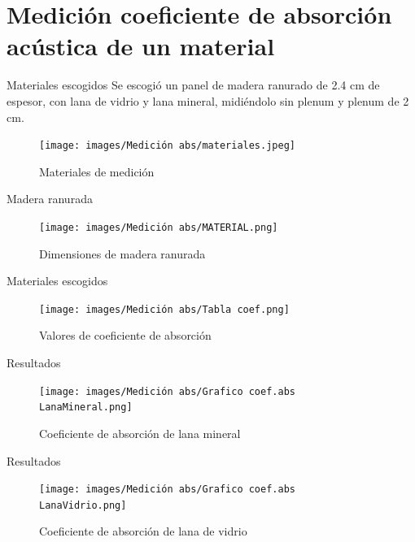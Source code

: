 \documentclass{sintefbeamer}
\begin{document}
\section{Medición coeficiente de absorción acústica de un material}
\begin{frame}{Materiales escogidos}
    Se escogió un panel de madera ranurado de 2.4 cm de espesor, con lana de vidrio y lana mineral, midiéndolo sin plenum y plenum de 2 cm.
    \begin{figure}[H]
        \centering
        \texttt{[image: images/Medición abs/materiales.jpeg]}
        \caption{Materiales de medición}
        \label{fig: materiales a medir}
    \end{figure}
\end{frame}

\begin{frame}{Madera ranurada}
    \begin{figure}[H]
        \centering
        \texttt{[image: images/Medición abs/MATERIAL.png]}
        \caption{Dimensiones de madera ranurada}
        \label{fig: madera ranurada}
    \end{figure}
\end{frame}

\begin{frame}{Materiales escogidos}
    \begin{figure}
        \centering
        \texttt{[image: images/Medición abs/Tabla coef.png]}
        \caption{Valores de coeficiente de absorción}
        \label{fig: coef abs materiales escogidos}
    \end{figure}
\end{frame}

\begin{frame}{Resultados}
    \begin{figure}
        \centering
        \texttt{[image: images/Medición abs/Grafico coef.abs LanaMineral.png]}
        \caption{Coeficiente de absorción de lana mineral}
        \label{fig:grafico coef Lana mineral}
    \end{figure}
\end{frame}

\begin{frame}{Resultados}
    \begin{figure}
        \centering
        \texttt{[image: images/Medición abs/Grafico coef.abs LanaVidrio.png]}
        \caption{Coeficiente de absorción de lana de vidrio}
        \label{fig:grafico coef Lana vidrio}
    \end{figure}
\end{frame}
\end{document}
